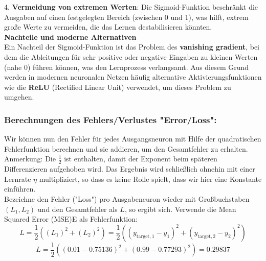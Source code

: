 \documentclass[12pt]{article}
\begin{document}
4. \textbf{Vermeidung von extremen Werten}: Die Sigmoid-Funktion beschränkt die Ausgaben auf einen festgelegten Bereich (zwischen 0 und 1), was hilft, extrem große Werte zu vermeiden, die das Lernen destabilisieren könnten.\\[0.3cm]
\textbf{Nachteile und moderne Alternativen}\\
Ein Nachteil der Sigmoid-Funktion ist das Problem des \textbf{vanishing gradient}, bei dem die Ableitungen für sehr positive oder negative Eingaben zu kleinen Werten (nahe 0) führen können, was den Lernprozess verlangsamt. Aus diesem Grund werden in modernen neuronalen Netzen häufig alternative Aktivierungsfunktionen wie die \textbf{ReLU} (Rectified Linear Unit)  verwendet, um dieses Problem zu umgehen.\\
\subsubsection{Berechnungen des Fehlers/Verlustes "Error/Loss":}
%
Wir können nun den Fehler für jedes Ausgangsneuron mit Hilfe der quadratischen Fehlerfunktion berechnen und sie addieren, um den Gesamtfehler zu erhalten.\\
Anmerkung: Die $\frac{1}{2}$ ist enthalten, damit der Exponent beim späteren Differenzieren aufgehoben wird. Das Ergebnis wird schließlich ohnehin mit einer Lernrate $\eta$ multipliziert, so dass es keine Rolle spielt, dass wir hier eine Konstante einführen. \\ Bezeichne den Fehler ("Loss") pro Ausgabeneuron wieder mit Großbuchstaben $(L_1,L_2)$ und den Gesamtfehler als $L$, so ergibt sich. Verwende die Mean Squared Error (MSE)E als Fehlerfunktion:
\[
L = \frac{1}{2} \left( (L_1)^2 + (L_2)^2 \right) = \frac{1}{2} \left( (y_{\text{target},1} - y_1)^2 + (y_{\text{target},2} - y_2)^2 \right) 
\]
\[
L = \frac{1}{2} \left( (0.01 - 0.75136)^2 + (0.99 - 0.77293)^2 \right) = 0.29837
\]
\end{document}
